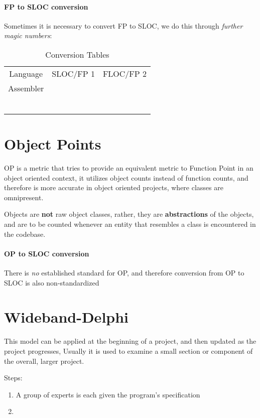 \documentclass[openright, twoside, twocolumn]{report}
\begin{document}
\paragraph{FP to SLOC conversion}

Sometimes it is necessary to convert FP to SLOC, we do this through \emph{further magic numbers}:

\begin{table}[h!]
  \centering
  \begin{tabular}{c c c}
      \rowcolor{gray!50}
      Language & SLOC/FP 1 &  FLOC/FP 2 \\
      Assembler &  &   \\
       &  &   \\
       &  &   \\
       &  &   \\
       &  &   \\
       &  &   \\
       &  & \\
  \end{tabular}
  \caption{Conversion Tables}
  \label{tab:langs}
\end{table} %

\section{Object Points}

OP is a metric that tries to provide an equivalent metric to Function Point in an object oriented context,
it utilizes object counts instead of function counts, and therefore is more accurate in object oriented projects,
where classes are omnipresent.

Objects are \textbf{not} raw object classes, rather, they are \textbf{abstractions} of the objects,
and are to be counted whenever an entity that resembles a class is encountered in the codebase.

\paragraph{OP to SLOC conversion}
There is \emph{no} established standard for OP, and therefore conversion from OP to SLOC is also
non-standardized

\section{Wideband-Delphi}

This model can be applied at the beginning of a project, and then updated as the project progresses,
Usually it is used to examine a small section or component of the overall, larger project.

Steps:

\begin{enumerate}
  \item A group of experts is each given the program's specification
  \item %
\end{enumerate}
\end{document}
